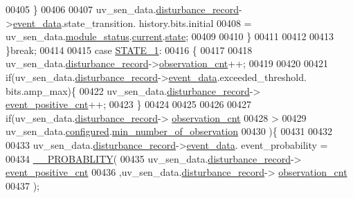 \begin{DoxyCode}
00405              \}
00406 
00407                  uv\_sen\_data.\hyperlink{a00035_ac9b38e2c1d3f1013a88d33506c754152}{disturbance\_record}->\hyperlink{a00028_a8c0bda69e71ef674e60da47ad0be9ab0}{event\_data}.state\_transition.
      history.bits.initial
00408                 = uv\_sen\_data.\hyperlink{a00035_a5a53c391562b059eb744ac679f3765ca}{module\_status}.\hyperlink{a00017_ab8af48cdbba92b3ae39c4470e53af944}{current}.\hyperlink{a00017_a6b8d8e916bc56265a3fd279bd26b6d1b}{state};
00409 
00410             \}
00411 
00412 
00413         \}\textcolor{keywordflow}{break};
00414 
00415          \textcolor{keywordflow}{case} \hyperlink{a00021_a727351838367f27ac0adb9a13422c342}{STATE\_1}:
00416         \{
00417 
00418             uv\_sen\_data.\hyperlink{a00035_ac9b38e2c1d3f1013a88d33506c754152}{disturbance\_record}->\hyperlink{a00028_ad5b0bac02ce266b91b2b52a1c3ea1d78}{observation\_cnt}++;
00419 
00420 
00421            \textcolor{keywordflow}{if}(uv\_sen\_data.\hyperlink{a00035_ac9b38e2c1d3f1013a88d33506c754152}{disturbance\_record}->\hyperlink{a00028_a8c0bda69e71ef674e60da47ad0be9ab0}{event\_data}.exceeded\_threshold.
      bits.amp\_max)\{
00422                  uv\_sen\_data.\hyperlink{a00035_ac9b38e2c1d3f1013a88d33506c754152}{disturbance\_record}->
      \hyperlink{a00028_a7397b9d76d4b57500f27bb23d258a18a}{event\_positive\_cnt}++;
00423            \}
00424 
00425 
00426 
00427                \textcolor{keywordflow}{if}(uv\_sen\_data.\hyperlink{a00035_ac9b38e2c1d3f1013a88d33506c754152}{disturbance\_record}->
      \hyperlink{a00028_ad5b0bac02ce266b91b2b52a1c3ea1d78}{observation\_cnt}
00428                 >
00429                 uv\_sen\_data.\hyperlink{a00035_a94b2d1f6ea4ab334c74d24984dd27843}{configured}.\hyperlink{a00021_ae8665e8bf422c1482442d6949ba28408}{min\_number\_of\_observation}
00430                )\{
00431 
00432 
00433                     uv\_sen\_data.\hyperlink{a00035_ac9b38e2c1d3f1013a88d33506c754152}{disturbance\_record}->\hyperlink{a00028_a8c0bda69e71ef674e60da47ad0be9ab0}{event\_data}.
      event\_probability =
00434                            \hyperlink{a00021_ab2185512402ea26115af112ce48175b2}{\_\_PROBABLITY}(
00435                            uv\_sen\_data.\hyperlink{a00035_ac9b38e2c1d3f1013a88d33506c754152}{disturbance\_record}->
      \hyperlink{a00028_a7397b9d76d4b57500f27bb23d258a18a}{event\_positive\_cnt}
00436                           ,uv\_sen\_data.\hyperlink{a00035_ac9b38e2c1d3f1013a88d33506c754152}{disturbance\_record}->
      \hyperlink{a00028_ad5b0bac02ce266b91b2b52a1c3ea1d78}{observation\_cnt}
00437                            );

\end{DoxyCode}
